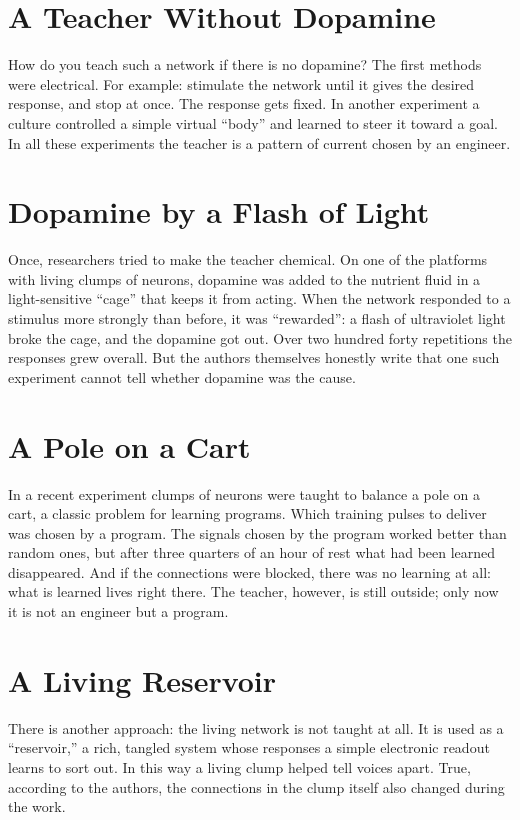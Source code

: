\section*{A Teacher Without Dopamine}

How do you teach such a network if there is no dopamine? The first methods were electrical. For example: stimulate the network until it gives the desired response, and stop at once. The response gets fixed. In another experiment a culture controlled a simple virtual ``body'' and learned to steer it toward a goal. In all these experiments the teacher is a pattern of current chosen by an engineer.

\section*{Dopamine by a Flash of Light}

Once, researchers tried to make the teacher chemical. On one of the platforms with living clumps of neurons, dopamine was added to the nutrient fluid in a light-sensitive ``cage'' that keeps it from acting. When the network responded to a stimulus more strongly than before, it was ``rewarded'': a flash of ultraviolet light broke the cage, and the dopamine got out. Over two hundred forty repetitions the responses grew overall. But the authors themselves honestly write that one such experiment cannot tell whether dopamine was the cause.

\section*{A Pole on a Cart}

In a recent experiment clumps of neurons were taught to balance a pole on a cart, a classic problem for learning programs. Which training pulses to deliver was chosen by a program. The signals chosen by the program worked better than random ones, but after three quarters of an hour of rest what had been learned disappeared. And if the  connections were blocked, there was no learning at all: what is learned lives right there. The teacher, however, is still outside; only now it is not an engineer but a program.

\section*{A Living Reservoir}

There is another approach: the living network is not taught at all. It is used as a ``reservoir,'' a rich, tangled system whose responses a simple electronic readout learns to sort out. In this way a living clump helped tell voices apart. True, according to the authors, the connections in the clump itself also changed during the work.

